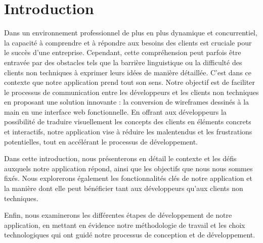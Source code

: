 \chapter*{Introduction}
\label{chap:introduction}

\vspace{0.5cm} %

Dans un environnement professionnel de plus en plus dynamique et concurrentiel, la capacité à comprendre et à répondre aux besoins des clients est cruciale pour le succès d'une entreprise. Cependant, cette compréhension peut parfois être entravée par des obstacles tels que la barrière linguistique ou la difficulté des clients non techniques à exprimer leurs idées de manière détaillée.
\vspace{0.5cm} %
C'est dans ce contexte que notre application prend tout son sens. Notre objectif est de faciliter le processus de communication entre les développeurs et les clients non techniques en proposant une solution innovante : la conversion de wireframes dessinés à la main en une interface web fonctionnelle.
\vspace{0.5cm} %
En offrant aux développeurs la possibilité de traduire visuellement les concepts des clients en éléments concrets et interactifs, notre application vise à réduire les malentendus et les frustrations potentielles, tout en accélérant le processus de développement.

\vspace{0.5cm} %

Dans cette introduction, nous présenterons en détail le contexte et les défis auxquels notre application répond, ainsi que les objectifs que nous nous sommes fixés. Nous explorerons également les fonctionnalités clés de notre application et la manière dont elle peut bénéficier tant aux développeurs qu'aux clients non techniques.

\vspace{0.5cm} %

Enfin, nous examinerons les différentes étapes de développement de notre application, en mettant en évidence notre méthodologie de travail et les choix technologiques qui ont guidé notre processus de conception et de développement.
